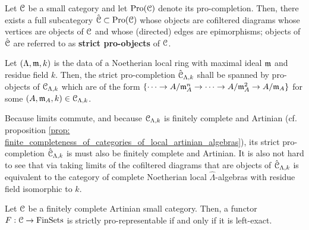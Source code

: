            \begin{definition} \label{def: strict_pro_objects}
                Let $\mathcal{C}$ be a small category and let $\mathrm{Pro}(\mathcal{C})$ denote its pro-completion. Then, there exists a full subcategory $\hat{\mathcal{C}} \subset \mathrm{Pro}(\mathcal{C})$ whose objects are cofiltered diagrams whose vertices are objects of $\mathcal{C}$ and whose (directed) edges are epimorphisms; objects of $\hat{\mathcal{C}}$ are referred to as \textbf{strict pro-objects} of $\mathcal{C}$. 
            \end{definition}
            \begin{example} \label{example: completed_artinian_local_algebras}
                Let $(\Lambda, \mathfrak{m}, k)$ is the data of a Noetherian local ring with maximal ideal $\mathfrak{m}$ and residue field $k$. Then, the strict pro-completion $\hat{\mathcal{C}}_{\Lambda, k}$ shall be spanned by pro-objects of $\mathcal{C}_{\Lambda, k}$ which are of the form $\{\cdots \to A/\mathfrak{m}_A^n \to \cdots \to A/\mathfrak{m}_A^2 \to A/\mathfrak{m}_A\}$ for some $(A, \mathfrak{m}_A, k) \in \mathcal{C}_{\Lambda, k}$. 
                
                Because limits commute, and because $\mathcal{C}_{\Lambda, k}$ is finitely complete and Artinian (cf. proposition \ref{prop: finite_completeness_of_categories_of_local_artinian_algebras}), its strict pro-completion $\hat{\mathcal{C}}_{\Lambda, k}$ is must also be finitely complete and Artinian. It is also not hard to see that via taking limits of the cofiltered diagrams that are objects of $\hat{\mathcal{C}}_{\Lambda, k}$ is equivalent to the category of complete Noetherian local $\hat{\Lambda}$-algebras with residue field isomorphic to $k$.
            \end{example}
            \begin{theorem} \label{theorem: grothendieck_pro_representability_criterion}
                \cite[Proposition 3.1]{grothendieck_fga_2} Let $\mathcal{C}$ be a finitely complete Artinian small category. Then, a functor $F: \mathcal{C} \to \mathrm{Fin}\mathrm{Sets}$ is strictly pro-representable if and only if it is left-exact.
            \end{theorem}
            
